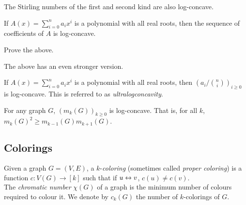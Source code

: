 
	The Stirling numbers of the first and second kind are also log-concave.

	\begin{fprop}
		If $A(x) = \sum_{i=0}^n a_i x^i$ is a polynomial with all real roots, then the sequence of coefficients of $A$ is log-concave.
	\end{fprop}

	\begin{exercise}
		Prove the above.
	\end{exercise}

	The above has an even stronger version.

	\begin{fprop}
		If $A(x) = \sum_{i=0}^n a_i x^i$ is a polynomial with all real roots, then $\left(a_i/\binom{n}{i}\right)_{i \ge 0}$ is log-concave. This is referred to as \emph{ultralogconcavity}.
	\end{fprop}

	\begin{fcor}
		For any graph $G$, $(m_k(G))_{k\ge 0}$ is log-concave. That is, for all $k$, $m_k(G)^2 \ge m_{k-1}(G)m_{k+1}(G)$.
	\end{fcor}





\subsection{Colorings}

	\begin{fdef}
		Given a graph $G=(V,E)$, a $k$-\emph{coloring} (sometimes called \emph{proper coloring}) is a function $c:V(G)\to[k]$ such that if $u\leftrightarrow v$, $c(u) \ne c(v)$.\\
		The \emph{chromatic number} $\chi(G)$ of a graph is the minimum number of colours required to colour it.
		We denote by $c_k(G)$ the number of $k$-colorings of $G$.
	\end{fdef}

